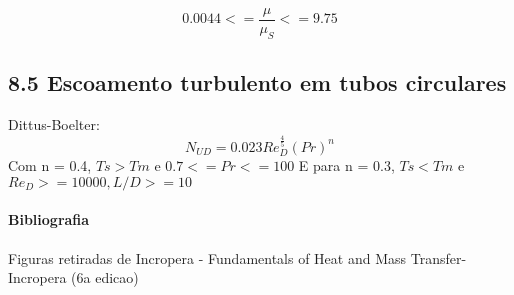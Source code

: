 \documentclass[a4paper, 12pt]{article}
\begin{document}
\[0.0044 <= \frac{\mu}{\mu_{S}} <= 9.75\]

\subsection*{8.5 Escoamento turbulento em tubos circulares}

Dittus-Boelter: 
\[N_{UD}=0.023Re_{D}^{\frac{4}{5}}(Pr)^{n}\]
Com n = 0.4, $Ts > Tm$ e $0.7 <=Pr<=100$
E para n = 0.3, $Ts < Tm$ e $Re_{D}>=10000, L/D >=10$

\paragraph*{Bibliografia} Figuras retiradas de Incropera - Fundamentals of Heat and Mass Transfer-Incropera (6a edicao)
\end{document}
